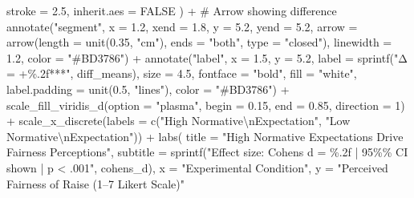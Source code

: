 \documentclass[
  letterpaper,
  DIV=11,
  numbers=noendperiod]{scrreprt}
\newenvironment{Shaded}{\begin{snugshade}}{\end{snugshade}}
\newcommand{\AttributeTok}[1]{\textcolor[rgb]{0.40,0.45,0.13}{#1}}
\newcommand{\CommentTok}[1]{\textcolor[rgb]{0.37,0.37,0.37}{#1}}
\newcommand{\ConstantTok}[1]{\textcolor[rgb]{0.56,0.35,0.01}{#1}}
\newcommand{\DecValTok}[1]{\textcolor[rgb]{0.68,0.00,0.00}{#1}}
\newcommand{\FloatTok}[1]{\textcolor[rgb]{0.68,0.00,0.00}{#1}}
\newcommand{\FunctionTok}[1]{\textcolor[rgb]{0.28,0.35,0.67}{#1}}
\newcommand{\NormalTok}[1]{\textcolor[rgb]{0.00,0.23,0.31}{#1}}
\newcommand{\SpecialCharTok}[1]{\textcolor[rgb]{0.37,0.37,0.37}{#1}}
\newcommand{\StringTok}[1]{\textcolor[rgb]{0.13,0.47,0.30}{#1}}
\begin{document}
\begin{Shaded}
\begin{Highlighting}[]
    \AttributeTok{stroke =} \FloatTok{2.5}\NormalTok{,}
    \AttributeTok{inherit.aes =} \ConstantTok{FALSE}
\NormalTok{  ) }\SpecialCharTok{+}
  \CommentTok{\# Arrow showing difference}
  \FunctionTok{annotate}\NormalTok{(}\StringTok{"segment"}\NormalTok{, }\AttributeTok{x =} \FloatTok{1.2}\NormalTok{, }\AttributeTok{xend =} \FloatTok{1.8}\NormalTok{, }\AttributeTok{y =} \FloatTok{5.2}\NormalTok{, }\AttributeTok{yend =} \FloatTok{5.2}\NormalTok{,}
           \AttributeTok{arrow =} \FunctionTok{arrow}\NormalTok{(}\AttributeTok{length =} \FunctionTok{unit}\NormalTok{(}\FloatTok{0.35}\NormalTok{, }\StringTok{"cm"}\NormalTok{), }\AttributeTok{ends =} \StringTok{"both"}\NormalTok{, }\AttributeTok{type =} \StringTok{"closed"}\NormalTok{),}
           \AttributeTok{linewidth =} \FloatTok{1.2}\NormalTok{, }\AttributeTok{color =} \StringTok{"\#BD3786"}\NormalTok{) }\SpecialCharTok{+}
  \FunctionTok{annotate}\NormalTok{(}\StringTok{"label"}\NormalTok{, }\AttributeTok{x =} \FloatTok{1.5}\NormalTok{, }\AttributeTok{y =} \FloatTok{5.2}\NormalTok{, }
           \AttributeTok{label =} \FunctionTok{sprintf}\NormalTok{(}\StringTok{"Δ = +\%.2f***"}\NormalTok{, diff\_means),}
           \AttributeTok{size =} \FloatTok{4.5}\NormalTok{, }\AttributeTok{fontface =} \StringTok{"bold"}\NormalTok{, }\AttributeTok{fill =} \StringTok{"white"}\NormalTok{, }
           \AttributeTok{label.padding =} \FunctionTok{unit}\NormalTok{(}\FloatTok{0.5}\NormalTok{, }\StringTok{"lines"}\NormalTok{),}
           \AttributeTok{color =} \StringTok{"\#BD3786"}\NormalTok{) }\SpecialCharTok{+}
   \FunctionTok{scale\_fill\_viridis\_d}\NormalTok{(}\AttributeTok{option =} \StringTok{"plasma"}\NormalTok{, }\AttributeTok{begin =} \FloatTok{0.15}\NormalTok{, }\AttributeTok{end =} \FloatTok{0.85}\NormalTok{, }\AttributeTok{direction =} \DecValTok{1}\NormalTok{) }\SpecialCharTok{+}
  \FunctionTok{scale\_x\_discrete}\NormalTok{(}\AttributeTok{labels =} \FunctionTok{c}\NormalTok{(}\StringTok{"High Normative}\SpecialCharTok{\textbackslash{}n}\StringTok{Expectation"}\NormalTok{, }\StringTok{"Low Normative}\SpecialCharTok{\textbackslash{}n}\StringTok{Expectation"}\NormalTok{)) }\SpecialCharTok{+}
  \FunctionTok{labs}\NormalTok{(}
    \AttributeTok{title =} \StringTok{"High Normative Expectations Drive Fairness Perceptions"}\NormalTok{,}
    \AttributeTok{subtitle =} \FunctionTok{sprintf}\NormalTok{(}\StringTok{"Effect size: Cohen\textquotesingle{}s d = \%.2f | 95\%\% CI shown | p \textless{} .001"}\NormalTok{, cohens\_d),}
    \AttributeTok{x =} \StringTok{"Experimental Condition"}\NormalTok{,}
    \AttributeTok{y =} \StringTok{"Perceived Fairness of Raise (1–7 Likert Scale)"}

\end{Highlighting}
\end{Shaded}
\end{document}
